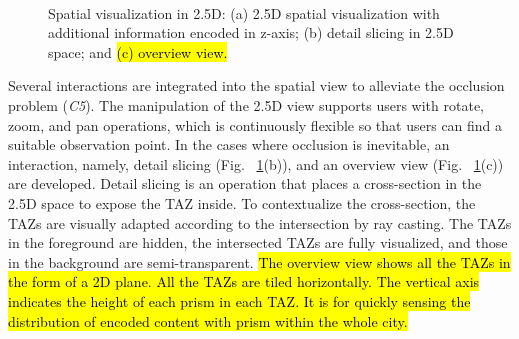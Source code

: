 \documentclass{ieeeaccess}
\begin{document}
\begin{figure}
    \centering
    \label{1a}\hfill
    \label{1b}\hfill
    \label{1c}\\
\caption{Spatial visualization in 2.5D: (a) 2.5D spatial visualization with additional information encoded in z-axis; (b) detail slicing in 2.5D space; and \hl{(c) overview view.}}
\label{fig:2.5D}
\end{figure}

Several interactions are integrated into the spatial view to alleviate the occlusion problem (\textit{C5}). The manipulation of the 2.5D view supports users with rotate, zoom, and pan operations, which is continuously flexible so that users can find a suitable observation point. In the cases where occlusion is inevitable, an interaction, namely, detail slicing (Fig. ~\ref{fig:2.5D}(b)), and an overview view (Fig. ~\ref{fig:2.5D}(c)) are developed. Detail slicing is an operation that places a cross-section in the 2.5D space to expose the TAZ inside. To contextualize the cross-section, the TAZs are visually adapted according to the intersection by ray casting. The TAZs in the foreground are hidden, the intersected TAZs are fully visualized, and those in the background are semi-transparent. \hl{The overview view shows all the TAZs in the form of a 2D plane. All the TAZs are tiled horizontally. The vertical axis indicates the height of each prism in each TAZ. It is for quickly sensing the distribution of encoded content with prism within the whole city.}
\end{document}
